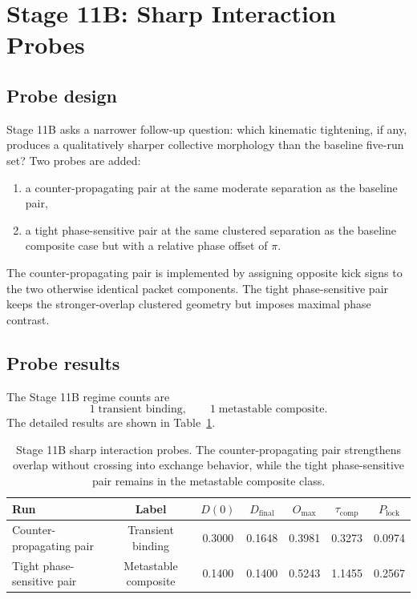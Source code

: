 \documentclass[11pt]{article}
\begin{document}
\section{Stage 11B: Sharp Interaction Probes}
\subsection{Probe design}
Stage 11B asks a narrower follow-up question: which kinematic tightening, if any, produces a qualitatively sharper collective morphology than the baseline five-run set? Two probes are added:
\begin{enumerate}
\item a counter-propagating pair at the same moderate separation as the baseline pair,
\item a tight phase-sensitive pair at the same clustered separation as the baseline composite case but with a relative phase offset of $\pi$.
\end{enumerate}
The counter-propagating pair is implemented by assigning opposite kick signs to the two otherwise identical packet components. The tight phase-sensitive pair keeps the stronger-overlap clustered geometry but imposes maximal phase contrast.

\subsection{Probe results}
The Stage 11B regime counts are
\begin{equation}
1\;\text{transient binding},\qquad 1\;\text{metastable composite}.
\end{equation}
The detailed results are shown in Table~\ref{tab:11B-runs}.

\begin{table}[t]
\centering
\begin{tabular}{lcccccc}
\hline
Run & Label & $D(0)$ & $D_{\mathrm{final}}$ & $O_{\max}$ & $\tau_{\mathrm{comp}}$ & $P_{\mathrm{lock}}$ \\
\hline
Counter-propagating pair & Transient binding & 0.3000 & 0.1648 & 0.3981 & 0.3273 & 0.0974 \\
Tight phase-sensitive pair & Metastable composite & 0.1400 & 0.1400 & 0.5243 & 1.1455 & 0.2567 \\
\hline
\end{tabular}
\caption{Stage 11B sharp interaction probes. The counter-propagating pair strengthens overlap without crossing into exchange behavior, while the tight phase-sensitive pair remains in the metastable composite class.}
\label{tab:11B-runs}
\end{table}
\end{document}
